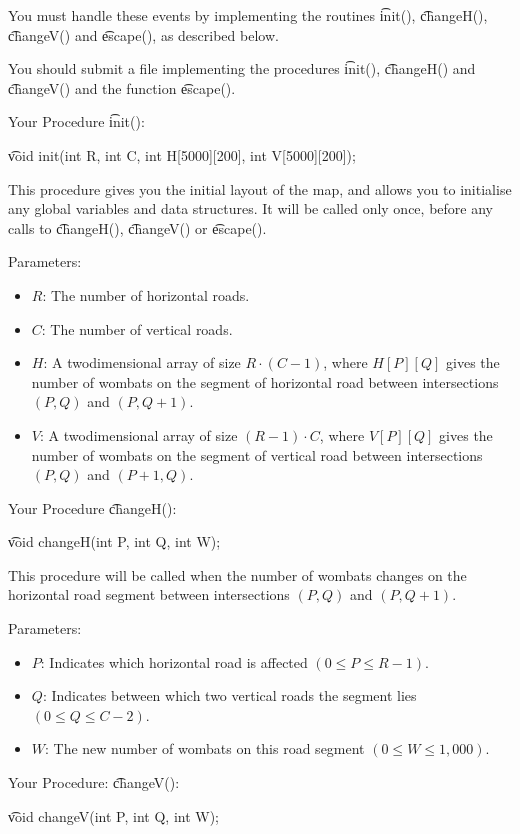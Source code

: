 You must handle these events by implementing the routines \t{init()}, \t{changeH()}, \t{changeV()} and \t{escape()}, as described below.

You should submit a file implementing the procedures \t{init()}, \t{changeH()} and \t{changeV()} and the function \t{escape()}.

Your Procedure \t{init()}:

\t{void init(int R, int C, int H[5000][200], int V[5000][200]);}

This procedure gives you the initial layout of the map, and allows you to initialise any global variables and data structures. It will be called only once, before any calls to
\t{changeH()}, \t{changeV()} or \t{escape()}. 

Parameters:
\begin{itemize}
\item $R$: The number of horizontal roads.
\item $C$: The number of vertical roads.
\item $H$: A two­dimensional array of size $R \cdot (C ­- 1)$, where $H[P][Q]$ gives the number of wombats on the segment of horizontal road between intersections $(P, Q)$ and $(P, Q + 1)$.
\item $V$: A two­dimensional array of size $(R ­- 1) \cdot C$, where $V[P][Q]$ gives the number of wombats on the segment of vertical road between intersections $(P, Q)$ and $(P + 1, Q)$.
\end{itemize}

Your Procedure \t{changeH()}:

\t{void changeH(int P, int Q, int W);}

This procedure will be called when the number of wombats changes on the horizontal road segment between intersections $(P, Q)$ and $(P, Q + 1)$.

Parameters:
\begin{itemize}
\item $P$: Indicates which horizontal road is affected $(0 \leq P \leq R ­- 1)$.
\item $Q$: Indicates between which two vertical roads the segment lies $(0 \leq Q \leq C ­- 2)$.
\item $W$: The new number of wombats on this road segment $(0 \leq W \leq 1,000)$.
\end{itemize}



Your Procedure: \t{changeV()}:

\t{void changeV(int P, int Q, int W);}

